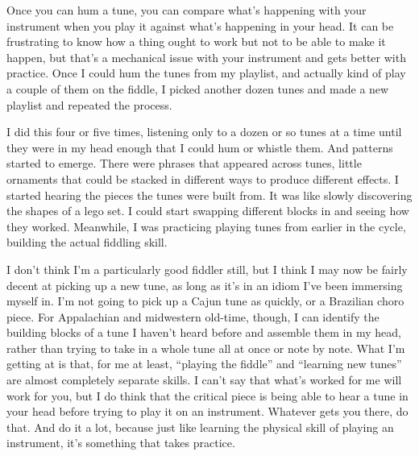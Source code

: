 Once you can hum a tune, you can compare what's happening with your
instrument when you play it against what's happening in your head. It
can be frustrating to know how a thing ought to work but not to be
able to make it happen, but that's a mechanical issue with your
instrument and gets better with practice. Once I could hum the tunes
from my playlist, and actually kind of play a couple of them on the
fiddle, I picked another dozen tunes and made a new playlist and
repeated the process.

I did this four or five times, listening only to a dozen or so tunes
at a time until they were in my head enough that I could hum or
whistle them. And patterns started to emerge. There were phrases that
appeared across tunes, little ornaments that could be stacked in
different ways to produce different effects. I started hearing the
pieces the tunes were built from. It was like slowly discovering the
shapes of a lego set. I could start swapping different blocks in and
seeing how they worked. Meanwhile, I was practicing playing tunes from
earlier in the cycle, building the actual fiddling skill.

I don't think I'm a particularly good fiddler still, but I think I may
now be fairly decent at picking up a new tune, as long as it's in an
idiom I've been immersing myself in. I'm not going to pick up a Cajun
tune as quickly, or a Brazilian choro piece. For Appalachian and
midwestern old-time, though, I can identify the building blocks of a
tune I haven't heard before and assemble them in my head, rather than
trying to take in a whole tune all at once or note by note. What I'm
getting at is that, for me at least, ``playing the fiddle'' and
``learning new tunes'' are almost completely separate skills. I can't
say that what's worked for me will work for you, but I do think that
the critical piece is being able to hear a tune in your head before
trying to play it on an instrument. Whatever gets you there, do
that. And do it a lot, because just like learning the physical skill
of playing an instrument, it's something that takes practice.

\cleardoublepage
